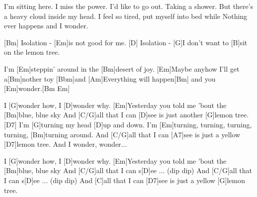 \begin{guitar}
	I'm sitting here. I miss the power.
	I'd like to go out. Taking a shower.
	But there's a heavy cloud inside my head.
	I feel so tired, put myself into bed while
	Nothing ever happens and I wonder.
	
	[Bm] Isolation - [Em]is not good for me.
	[D] Isolation - [G]I don't want to [B]sit on the lemon tree.
	
	I'm [Em]steppin' around in the [Bm]desert of joy.
	[Em]Maybe anyhow I'll get a[Bm]nother toy [Bbm]and
	[Am]Everything will happen[Bm] and you [Em]wonder.[Bm Em]{}
	
	\begin{highlightbar}
		I [G]wonder how, I [D]wonder why. 
		[Em]Yesterday you told me 'bout the [Bm]blue, blue sky
		And [C/G]all that I can [D]see is just another [G]lemon tree.[D7]{}
		I'm [G]turning my head [D]up and down.
		I'm [Em]turning, turning, turning, turning, [Bm]turning around.
		And [C/G]all that I can [A7]see is just a yellow [D7]lemon tree. And I wonder, wonder...
	\end{highlightbar}
	
	I [G]wonder how, I [D]wonder why. 
	[Em]Yesterday you told me 'bout the [Bm]blue, blue sky
	And [C/G]all that I can s[D]ee ... (dip dip)
	And [C/G]all that I can s[D]ee ... (dip dip)
	And [C]all that I can [D7]see is just a yellow [G]lemon tree.
\end{guitar}